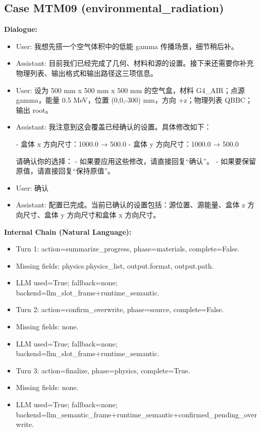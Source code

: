 \documentclass[11pt]{ctexart}
\begin{document}
\subsection{Case MTM09 (environmental\_radiation)}
\textbf{Dialogue:}
\begin{itemize}
\item User: 我想先搭一个空气体积中的低能 gamma 传播场景，细节稍后补。
\item Assistant: 目前我们已经完成了几何、材料和源的设置。接下来还需要你补充物理列表、输出格式和输出路径这三项信息。
\item User: 设为 500 mm x 500 mm x 500 mm 的空气盒，材料 G4\_AIR；点源 gamma，能量 0.5 MeV，位置 (0,0,-300) mm，方向 +z；物理列表 QBBC；输出 root。
\item Assistant: 我注意到这会覆盖已经确认的设置。具体修改如下：

- 盒体 x 方向尺寸：1000.0 → 500.0
- 盒体 y 方向尺寸：1000.0 → 500.0

请确认你的选择：
- 如果要应用这些修改，请直接回复“确认”。
- 如果要保留原值，请直接回复“保持原值”。
\item User: 确认
\item Assistant: 配置已完成。当前已确认的设置包括：源位置、源能量、盒体 z 方向尺寸、盒体 y 方向尺寸和盒体 x 方向尺寸。
\end{itemize}
\textbf{Internal Chain (Natural Language):}
\begin{itemize}
\item Turn 1: action=summarize\_progress, phase=materials, complete=False.
\item Missing fields: physics.physics\_list, output.format, output.path.
\item LLM used=True; fallback=none; backend=llm\_slot\_frame+runtime\_semantic.
\item Turn 2: action=confirm\_overwrite, phase=source, complete=False.
\item Missing fields: none.
\item LLM used=True; fallback=none; backend=llm\_slot\_frame+runtime\_semantic.
\item Turn 3: action=finalize, phase=physics, complete=True.
\item Missing fields: none.
\item LLM used=True; fallback=none; backend=llm\_semantic\_frame+runtime\_semantic+confirmed\_pending\_overwrite.
\end{itemize}
\end{document}
